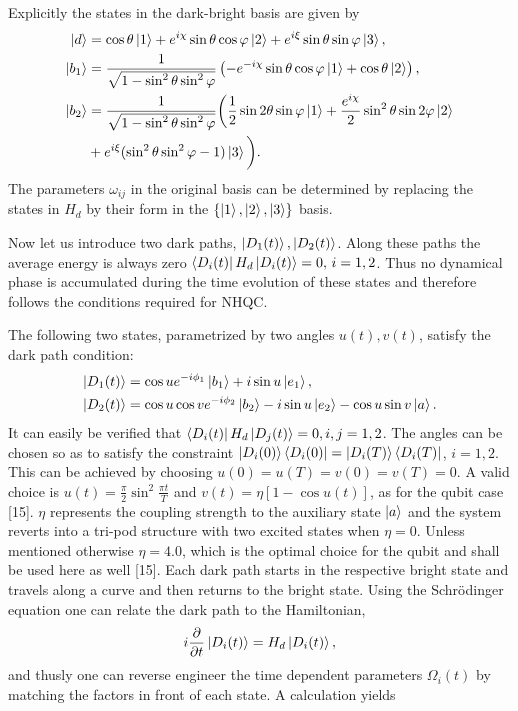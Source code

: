 Explicitly the states in the dark-bright basis are given by 
\begin{equation}
\label{eq:states}
\begin{aligned}
\ket{d} &= \cos\theta\ket{1} + e^{i\chi}\sin\theta\cos\varphi\ket{2} + e^{i\xi}\sin\theta\sin\varphi\ket{3},
\\
\ket{b_1} &= \frac{1}{\sqrt{1-\sin^2\theta\sin^2\varphi}} \left(-e^{-i\chi}\sin\theta\cos\varphi\ket{1} + \cos\theta\ket{2} \right),
\\
\ket{b_2} &= \frac{1}{\sqrt{1-\sin^2\theta\sin^2\varphi}} \bigg(\frac{1}{2}\sin 2\theta\sin\varphi\ket{1} + \dfrac{e^{i\chi}}{2}\sin^2\theta\sin 2\varphi\ket{2} \\&+ e^{i\xi}(\sin^2\theta\sin^2\varphi - 1)\ket{3}\bigg).
\end{aligned}
\end{equation}
The parameters $\omega_{ij}$ in the original basis can be determined by replacing the states in $H_d$ by their form in the $\{\ket{1},\ket{2},\ket{3}\}$ basis.

Now let us introduce two dark paths, $\ket{D_1(t)},\ket{D_2(t)}$. Along these paths the average energy is always zero $\bra{D_i(t)}H_d\ket{D_i(t)} = 0,\,i = 1,2$. Thus no dynamical phase is accumulated during the time evolution of these states and therefore follows the conditions required for NHQC.

The following two states, parametrized by two angles $u(t), v(t)$, satisfy the dark path condition:
\begin{equation}
\label{eq:dpaths}
\begin{aligned}
\ket{D_1(t)} &= \cos u e^{-i\phi_1}\ket{b_1} + i\sin u \ket{e_1},
\\
\ket{D_2(t)} &= \cos u\cos v e^{-i\phi_2}\ket{b_2} - i\sin u \ket{e_2} - \cos u\sin v \ket{a}.
\end{aligned}
\end{equation}
It can easily be verified that $\bra{D_i(t)}H_d\ket{D_j(t)} = 0, i,j = 1,2$. The angles can be chosen so as to satisfy the constraint $\ket{D_i(0)}\bra{D_i(0)} = \ket{D_i(T)}\bra{D_i(T)}$, $i = 1,2$. This can be achieved by choosing $u(0) = u(T) = v(0) = v(T) = 0$. A valid choice is $u(t) = \frac{\pi}{2}\sin^2\frac{\pi t}{T}$ and $v(t) = \eta\left[1 - \cos u(t)\right]$, as for the qubit case [15]. $\eta$ represents the coupling strength to the auxiliary state $\ket{a}$ and the system reverts into a tri-pod structure with two excited states when $\eta = 0$. Unless mentioned otherwise $\eta = 4.0$, which is the optimal choice for the qubit and shall be used here as well [15]. Each dark path starts in the respective bright state and travels along a curve and then returns to the bright state. Using the Schrödinger equation one can relate the dark path to the Hamiltonian,
\begin{equation}
i\pdv{}{t}\ket{D_i(t)} = H_d\ket{D_i(t)},
\end{equation}
and thusly one can reverse engineer the time dependent parameters $\Omega_i(t)$ by matching the factors in front of each state. A calculation yields 

